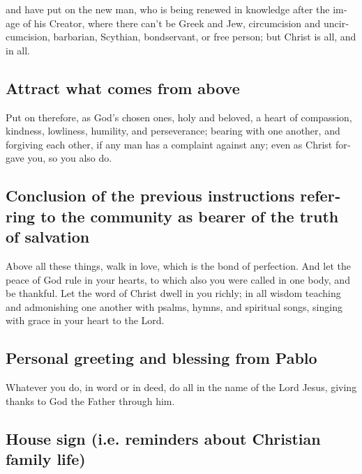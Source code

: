 \begin{paracol}{2}
\begin{otherlanguage}{english}
 and have put on the new man, who is being renewed in
knowledge after the image of his Creator,  where there
can't be Greek and Jew, circumcision and uncircumcision, barbarian,
Scythian, bondservant, or free person; but Christ is all, and in all.

\hypertarget{attract-what-comes-from-above}{%
\subsection{Attract what comes from
above}\label{attract-what-comes-from-above}}

 Put on therefore, as God's chosen ones, holy and
beloved, a heart of compassion, kindness, lowliness, humility, and
perseverance;  bearing with one another, and forgiving
each other, if any man has a complaint against any; even as Christ
forgave you, so you also do.

\hypertarget{conclusion-of-the-previous-instructions-referring-to-the-community-as-bearer-of-the-truth-of-salvation}{%
\subsection{Conclusion of the previous instructions referring to the
community as bearer of the truth of
salvation}\label{conclusion-of-the-previous-instructions-referring-to-the-community-as-bearer-of-the-truth-of-salvation}}

 Above all these things, walk in love, which is the bond
of perfection.  And let the peace of God rule in your
hearts, to which also you were called in one body, and be thankful.
 Let the word of Christ dwell in you richly; in all
wisdom teaching and admonishing one another with psalms, hymns, and
spiritual songs, singing with grace in your heart to the Lord.

\hypertarget{personal-greeting-and-blessing-from-pablo}{%
\subsection{Personal greeting and blessing from
Pablo}\label{personal-greeting-and-blessing-from-pablo}}

 Whatever you do, in word or in deed, do all in the name
of the Lord Jesus, giving thanks to God the Father through him.

\hypertarget{house-sign-i.e.-reminders-about-christian-family-life}{%
\subsection{House sign (i.e. reminders about Christian family
life)}\label{house-sign-i.e.-reminders-about-christian-family-life}}


\end{otherlanguage}
\end{paracol}
